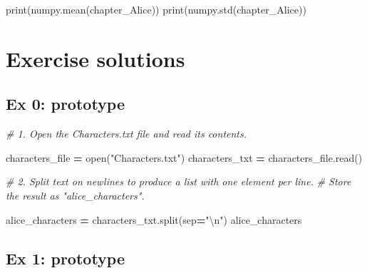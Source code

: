 \documentclass[
]{book}
\newenvironment{Shaded}{\begin{snugshade}}{\end{snugshade}}
\newcommand{\BuiltInTok}[1]{#1}
\newcommand{\CharTok}[1]{\textcolor[rgb]{0.31,0.60,0.02}{#1}}
\newcommand{\CommentTok}[1]{\textcolor[rgb]{0.56,0.35,0.01}{\textit{#1}}}
\newcommand{\NormalTok}[1]{#1}
\newcommand{\OperatorTok}[1]{\textcolor[rgb]{0.81,0.36,0.00}{\textbf{#1}}}
\newcommand{\StringTok}[1]{\textcolor[rgb]{0.31,0.60,0.02}{#1}}
\begin{document}
\begin{Shaded}
\begin{Highlighting}[]
\BuiltInTok{print}\NormalTok{(numpy.mean(chapter_Alice))}
\BuiltInTok{print}\NormalTok{(numpy.std(chapter_Alice))}
\end{Highlighting}
\end{Shaded}

\hypertarget{exercise-solutions-4}{%
\section{Exercise solutions}\label{exercise-solutions-4}}

\hypertarget{ex-0-prototype-4}{%
\subsection{Ex 0: prototype}\label{ex-0-prototype-4}}

\begin{Shaded}
\begin{Highlighting}[]
\CommentTok{# 1. Open the Characters.txt file and read its contents.}

\NormalTok{characters_file }\OperatorTok{=} \BuiltInTok{open}\NormalTok{(}\StringTok{"Characters.txt"}\NormalTok{)}
\NormalTok{characters_txt }\OperatorTok{=}\NormalTok{ characters_file.read()}

\CommentTok{# 2. Split text on newlines to produce a list with one element per line. }
\CommentTok{# Store the result as "alice_characters".}

\NormalTok{alice_characters }\OperatorTok{=}\NormalTok{ characters_txt.split(sep}\OperatorTok{=}\StringTok{"}\CharTok{\textbackslash{}n}\StringTok{"}\NormalTok{)}
\NormalTok{alice_characters}
\end{Highlighting}
\end{Shaded}

\hypertarget{ex-1-prototype-4}{%
\subsection{Ex 1: prototype}\label{ex-1-prototype-4}}
\end{document}

